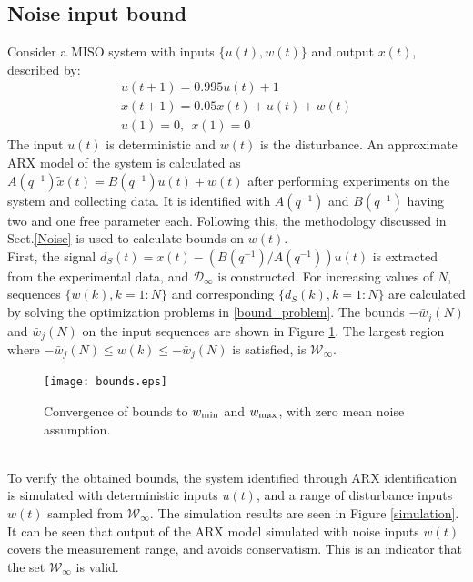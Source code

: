 \documentclass[letterpaper, 10 pt, conference]{ieeeconf}  %
\begin{document}
	\subsection{Noise input bound}
	Consider a MISO system with inputs $\{u(t),w(t)\}$ and output $x(t)$, described by:
	\begin{equation*}
	\begin{matrix}
	u(t+1) = 0.995u(t)+1 \\
	x(t+1) = 0.05x(t)+u(t)+w(t) \\
	u(1) = 0, \hspace{5pt} x(1) = 0
	\end{matrix}
	\end{equation*}
	The input $u(t)$ is deterministic and $w(t)$ is the disturbance. An approximate ARX model of the system is calculated as $A(q^{-1})\tilde{x}(t) = B(q^{-1})u(t)+w(t)$ after performing experiments on the system and collecting data. It is identified with $A(q^{-1})$ and $B(q^{-1})$ having two and one free parameter each. Following this, the methodology discussed in Sect.\ref{Noise} is used to calculate bounds on $w(t)$.
	\\
	First, the signal $d_S(t)=x(t) - (B(q^{-1})/A(q^{-1}))u(t)$ is extracted from the experimental data, and $\mathcal{D}_{\infty}$ is constructed. For increasing values of $N$, sequences $\{w(k),k=1:N\}$ and corresponding $\{d_S(k),k=1:N\}$ are calculated by solving the optimization problems in \eqref{bound_problem}. The bounds $-\bar{w}_j(N)$ and $\bar{w}_j(N)$ on the input sequences are shown in Figure \ref{bounds}.
	The largest region where $-\bar{w}_j(N) \leq w(k) \leq -\bar{w}_j(N)$ is satisfied, is $\mathcal{W}_{\infty}$. 
		\begin{figure}[h!]
			\hspace{30pt}
			\texttt{[image: bounds.eps]}
			\caption{Convergence of bounds to $w_{\rm min}$ and $w_{\rm max}$, with zero mean noise assumption.}
			\label{bounds}
		\end{figure} \vspace{-5pt}\\
	To verify the obtained bounds, the system identified through ARX identification is simulated with deterministic inputs $u(t)$, and a range of disturbance inputs $w(t)$ sampled from $\mathcal{W}_{\infty}$. The simulation results are seen in Figure \ref{simulation}. It can be seen that output of the ARX model simulated with noise inputs $w(t)$ covers the measurement range, and avoids conservatism. This is an indicator that the set $\mathcal{W}_{\infty}$ is valid.
\end{document}
